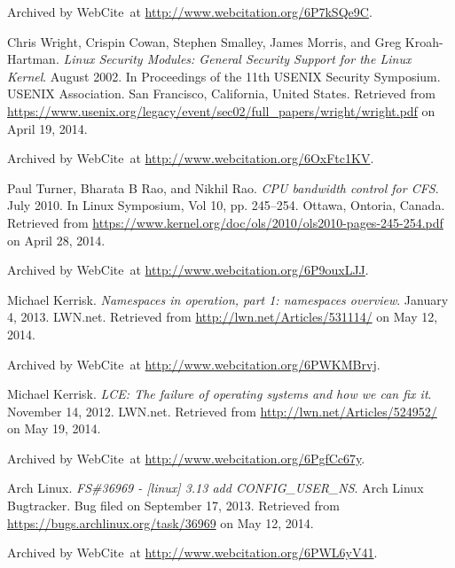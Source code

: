 \begin{thebibliography}{9}
Archived by WebCite\textsuperscript{\textregistered}\ at
\url{http://www.webcitation.org/6P7kSQe9C}.


Chris Wright, Crispin Cowan, Stephen Smalley, James Morris, and Greg
Kroah-Hartman. \emph{Linux Security Modules: General Security Support for the
Linux Kernel}. August 2002. In Proceedings of the 11th USENIX Security
Symposium. USENIX Association. San Francisco, California, United States.
Retrieved from
\url{https://www.usenix.org/legacy/event/sec02/full_papers/wright/wright.pdf}
on April 19, 2014.

Archived by WebCite\textsuperscript{\textregistered}\ at
\url{http://www.webcitation.org/6OxFtc1KV}.


Paul Turner, Bharata B Rao, and Nikhil Rao. \emph{CPU bandwidth control for
CFS}. July 2010. In Linux Symposium, Vol 10, pp. 245--254. Ottawa, Ontoria,
Canada. Retrieved from
\url{https://www.kernel.org/doc/ols/2010/ols2010-pages-245-254.pdf} on April
28, 2014.

Archived by WebCite\textsuperscript{\textregistered}\ at
\url{http://www.webcitation.org/6P9ouxLJJ}.


Michael Kerrisk. \emph{Namespaces in operation, part 1: namespaces overview}.
January 4, 2013. LWN.net. Retrieved from \url{http://lwn.net/Articles/531114/}
on May 12, 2014.

Archived by WebCite\textsuperscript{\textregistered}\ at
\url{http://www.webcitation.org/6PWKMBrvj}.


Michael Kerrisk. \emph{LCE: The failure of operating systems and how we can fix
it}. November 14, 2012. LWN.net. Retrieved from
\url{http://lwn.net/Articles/524952/} on May 19, 2014.

Archived by WebCite\textsuperscript{\textregistered}\ at
\url{http://www.webcitation.org/6PgfCc67y}.


Arch Linux. \emph{FS\#36969 - [linux] 3.13 add CONFIG\_USER\_NS}. Arch Linux
Bugtracker. Bug filed on September 17, 2013. Retrieved from
\url{https://bugs.archlinux.org/task/36969} on May 12, 2014.

Archived by WebCite\textsuperscript{\textregistered}\ at
\url{http://www.webcitation.org/6PWL6yV41}.


\end{thebibliography}

